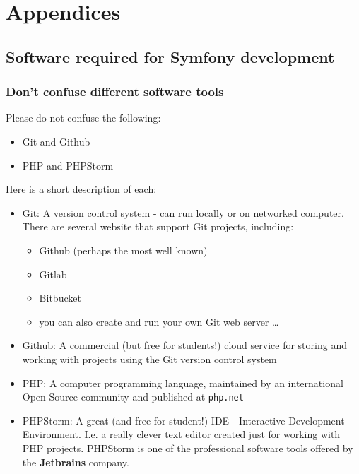 \documentclass[a4paperpaper,openright]{book}
\providecommand{\tightlist}{%
  \setlength{\itemsep}{0pt}\setlength{\parskip}{0pt}}
\begin{document}
\part{Appendices}

\appendix

\hypertarget{software-required-for-symfony-development}{%
\chapter{\texorpdfstring{Software required for Symfony
development\label{appendix_software}}{Software required for Symfony development}}\label{software-required-for-symfony-development}}

\hypertarget{dont-confuse-different-software-tools}{%
\section{Don't confuse different software
tools}\label{dont-confuse-different-software-tools}}

Please do not confuse the following:

\begin{itemize}
\tightlist
\item
  Git and Github
\item
  PHP and PHPStorm
\end{itemize}

Here is a short description of each:

\begin{itemize}
\item
  Git: A version control system - can run locally or on networked
  computer. There are several website that support Git projects,
  including:

  \begin{itemize}
  \tightlist
  \item
    Github (perhaps the most well known)
  \item
    Gitlab
  \item
    Bitbucket
  \item
    you can also create and run your own Git web server \ldots{}
  \end{itemize}
\item
  Github: A commercial (but free for students!) cloud service for
  storing and working with projects using the Git version control system
\item
  PHP: A computer programming language, maintained by an international
  Open Source community and published at \texttt{php.net}
\item
  PHPStorm: A great (and free for student!) IDE - Interactive
  Development Environment. I.e. a really clever text editor created just
  for working with PHP projects. PHPStorm is one of the professional
  software tools offered by the \textbf{Jetbrains} company.
\end{itemize}
\end{document}
